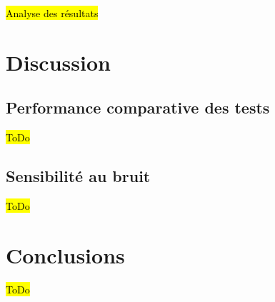 \documentclass{article}
\begin{document}
\hl{Analyse des résultats}


\section{Discussion}

\subsection{Performance comparative des tests}

\hl{ToDo}

\subsection{Sensibilité au bruit}

\hl{ToDo}



\section{Conclusions}

\hl{ToDo}



\end{document}
